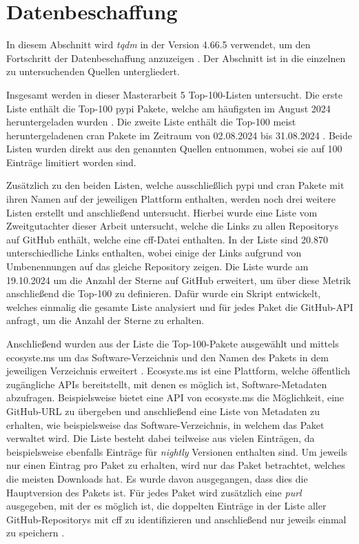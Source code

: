 \section{Datenbeschaffung}
\label{sec:datenbeschaffung}
In diesem Abschnitt wird \emph{tqdm} in der Version 4.66.5 verwendet, um den Fortschritt der Datenbeschaffung anzuzeigen \autocite{costa-luis_tqdm_2024}.
Der Abschnitt ist in die einzelnen zu untersuchenden Quellen untergliedert.

Insgesamt werden in dieser Masterarbeit 5 Top-100-Listen untersucht.
Die erste Liste enthält die Top-100 \gls{pypi} Pakete, welche am häufigsten im August 2024 heruntergeladen wurden \autocite{kemenade_top-pypi-packages_2024}.
Die zweite Liste enthält die Top-100 meist heruntergeladenen \gls{cran} Pakete im Zeitraum von 02.08.2024 bis 31.08.2024 \autocite{csardi_cranlogsapp_2024}.
Beide Listen wurden direkt aus den genannten Quellen entnommen, wobei sie auf 100 Einträge limitiert worden sind.

Zusätzlich zu den beiden Listen, welche ausschließlich \gls{pypi} und \gls{cran} Pakete mit ihren Namen auf der jeweiligen Plattform enthalten, werden noch drei weitere Listen erstellt und anschließend untersucht.
Hierbei wurde eine Liste vom Zweitgutachter dieser Arbeit untersucht, welche die Links zu allen Repositorys auf GitHub enthält, welche eine \gls{cff}-Datei enthalten.
In der Liste sind 20.870 unterschiedliche Links enthalten, wobei einige der Links aufgrund von Umbenennungen auf das gleiche Repository zeigen.
Die Liste wurde am 19.10.2024 um die Anzahl der Sterne auf GitHub erweitert, um über diese Metrik anschließend die Top-100 zu definieren.
Dafür wurde ein Skript entwickelt, welches einmalig die gesamte Liste analysiert und für jedes Paket die GitHub-API anfragt, um die Anzahl der Sterne zu erhalten.

Anschließend wurden aus der Liste die Top-100-Pakete ausgewählt und mittels ecosyste.ms um das Software-Verzeichnis und den Namen des Pakets in dem jeweiligen Verzeichnis erweitert \autocite{nesbitt_ecosystems_2024}.
Ecosyste.ms ist eine Plattform, welche öffentlich zugängliche APIs bereitstellt, mit denen es möglich ist, Software-Metadaten abzufragen.
Beispielsweise bietet eine API von ecosyste.ms die Möglichkeit, eine GitHub-URL zu übergeben und anschließend eine Liste von Metadaten zu erhalten, wie beispielsweise das Software-Verzeichnis, in welchem das Paket verwaltet wird.
Die Liste besteht dabei teilweise aus vielen Einträgen, da beispielsweise ebenfalls Einträge für \emph{nightly} Versionen enthalten sind.
Um jeweils nur einen Eintrag pro Paket zu erhalten, wird nur das Paket betrachtet, welches die meisten Downloads hat.
Es wurde davon ausgegangen, dass dies die Hauptversion des Pakets ist.
Für jedes Paket wird zusätzlich eine \emph{purl} ausgegeben, mit der es möglich ist, die doppelten Einträge in der Liste aller GitHub-Repositorys mit \gls{cff} zu identifizieren und anschließend nur jeweils einmal zu speichern \autocites{ombredanne_purl-spec_2024}{nesbitt_ecosystems_2024}.

